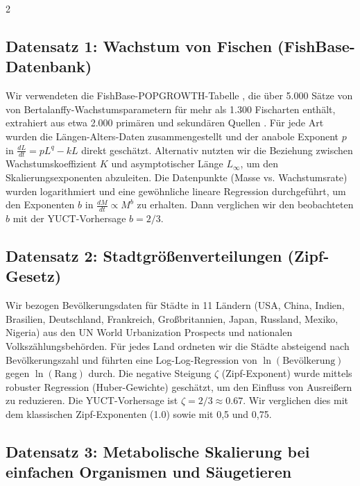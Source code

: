 \documentclass[11pt,a4paper]{article}
\begin{document}
\begin{multicols}{2}
		\subsection{Datensatz 1: Wachstum von Fischen (FishBase-Datenbank)}
		
		Wir verwendeten die FishBase-POPGROWTH-Tabelle \cite{FishBase}, die über 5.000 Sätze von von Bertalanffy-Wachstumsparametern für mehr als 1.300 Fischarten enthält, extrahiert aus etwa 2.000 primären und sekundären Quellen \cite{Pauly1998}. Für jede Art wurden die Längen-Alters-Daten zusammengestellt und der anabole Exponent \(p\) in \(\frac{dL}{dt} = p L^{q} - k L\) direkt geschätzt. Alternativ nutzten wir die Beziehung zwischen Wachstumskoeffizient \(K\) und asymptotischer Länge \(L_\infty\), um den Skalierungsexponenten abzuleiten. Die Datenpunkte (Masse vs. Wachstumsrate) wurden logarithmiert und eine gewöhnliche lineare Regression durchgeführt, um den Exponenten \(b\) in \(\frac{dM}{dt} \propto M^{b}\) zu erhalten. Dann verglichen wir den beobachteten \(b\) mit der YUCT-Vorhersage \(b = 2/3\).
		
		\subsection{Datensatz 2: Stadtgrößenverteilungen (Zipf-Gesetz)}
		
		Wir bezogen Bevölkerungsdaten für Städte in 11 Ländern (USA, China, Indien, Brasilien, Deutschland, Frankreich, Großbritannien, Japan, Russland, Mexiko, Nigeria) aus den UN World Urbanization Prospects \cite{UN2018} und nationalen Volkszählungsbehörden. Für jedes Land ordneten wir die Städte absteigend nach Bevölkerungszahl und führten eine Log-Log-Regression von \(\ln(\text{Bevölkerung})\) gegen \(\ln(\text{Rang})\) durch. Die negative Steigung \(\zeta\) (Zipf-Exponent) wurde mittels robuster Regression (Huber-Gewichte) geschätzt, um den Einfluss von Ausreißern zu reduzieren. Die YUCT-Vorhersage ist \(\zeta = 2/3 \approx 0.67\). Wir verglichen dies mit dem klassischen Zipf-Exponenten (1.0) sowie mit 0,5 und 0,75.
		
		\subsection{Datensatz 3: Metabolische Skalierung bei einfachen Organismen und Säugetieren}
		

\end{multicols}
\end{document}
